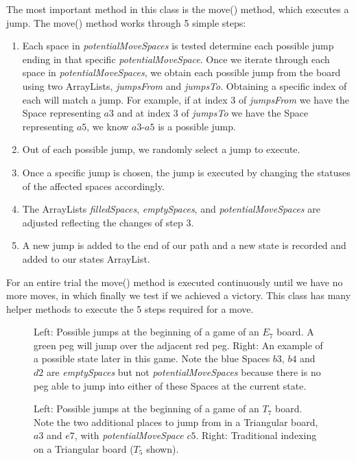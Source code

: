 \documentclass{article}
\begin{document}
The most important method in this class is the move() method, which executes a jump. The move() method works through 5 simple steps:
\begin{enumerate}
\item Each space in \textit{potentialMoveSpaces} is tested determine each possible jump ending in that specific \textit{potentialMoveSpace}. Once we iterate through each space in \textit{potentialMoveSpaces}, we obtain each possible jump from the board using two ArrayLists, \textit{jumpsFrom} and \textit{jumpsTo}. Obtaining a specific index of each will match a jump. For example, if at index 3 of \textit{jumpsFrom} we have the Space representing $a3$ and at index 3 of \textit{jumpsTo} we have the Space representing $a5$, we know $a3$-$a5$ is a possible jump.
\item Out of each possible jump, we randomly select a jump to execute.
\item Once a specific jump is chosen, the jump is executed by changing the statuses of the affected spaces accordingly.
\item The ArrayLists \textit{filledSpaces}, \textit{emptySpaces}, and \textit{potentialMoveSpaces} are adjusted reflecting the changes of step 3.
\item A new jump is added to the end of our path and a new state is recorded and added to our states ArrayList.
\end{enumerate}

For an entire trial the move() method is executed continuously until we have no more moves, in which finally we test if we achieved a victory. This class has many helper methods to execute the 5 steps required for a move. 

\begin{figure}[htb]
\centering
{}
\caption{Left: Possible jumps at the beginning of a game of an $E_7$ board. A green peg will jump over the adjacent red peg. Right: An example of a possible state later in this game. Note the blue Spaces $b3$, $b4$ and $d2$ are \textit{emptySpaces} but not \textit{potentialMoveSpaces} because there is no peg able to jump into either of these Spaces at the current state.}
\label{fig4}
\end{figure}

\begin{figure}[htb]
\centering
{}
\caption{Left: Possible jumps at the beginning of a game of an $T_7$ board. Note the two additional places to jump from in a Triangular board, $a3$ and $e7$, with \textit{potentialMoveSpace} $c5$. Right: Traditional indexing on a Triangular board ($T_5$ shown).}
\label{fig5}
\end{figure}
\end{document}
